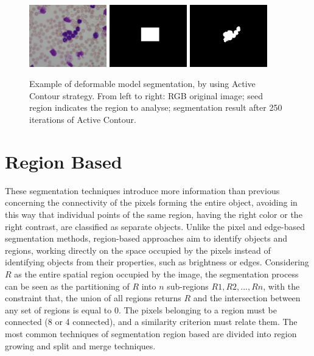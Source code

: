 \documentclass[final,a4paper,12pt,english]{UnicaPhdThesis3}
\begin{document}
\begin{figure}[h]
	\centering
	\includegraphics[width=0.3\textwidth]{images/figcs_rgb}
	\includegraphics[width=0.3\textwidth]{images/fig_snakes1}
	\includegraphics[width=0.3\textwidth]{images/fig_snakes2}
	\caption{\label{fig:snakes}Example of deformable model segmentation, by using Active Contour strategy. From left to right: RGB original image; seed region indicates the region to analyse; segmentation result after 250 iterations of Active Contour.}
\end{figure}

\section{Region Based} 
These segmentation techniques introduce more information than previous concerning the connectivity of the pixels forming the entire object, avoiding in this way that individual points of the same region, having the right color or the right contrast, are classified as separate objects. Unlike the pixel and edge-based segmentation methods, region-based approaches aim to identify objects and regions, working directly on the space occupied by the pixels instead of identifying objects from their properties, such as brightness or edges. Considering $R$ as the entire spatial region occupied by the image, the segmentation process can be seen as the partitioning of $R$ into $n$ sub-regions $R1, R2, ..., Rn$, with the constraint that, the union of all regions returns $R$ and the intersection between any set of regions is equal to $0$. The pixels belonging to a region must be connected (8 or 4 connected), and a similarity criterion must relate them. The most common techniques of segmentation region based are divided into region growing and split and merge techniques.
\end{document}
